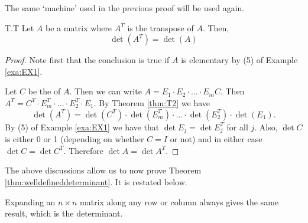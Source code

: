 The same `machine' used in the previous proof will be used again. 

\begin{theorem}{}{T.T} 
Let $A$ be a matrix where $A^T$ is the transpose of $A$. Then,
\begin{equation*}
\det\left(A^T\right) = \det \left( A \right)
\end{equation*}
\end{theorem} 

\begin{proof} 
Note first that the conclusion is true if $A$ is elementary by (5) of Example \ref{exa:EX1}. 

Let $C$ be the {\rref} of $A$. Then we can write 
$A= E_1\cdot E_2\cdot \dots\cdot E_m C$. 
Then $A^T=C^T\cdot E_m^T\cdot \dots \cdot E_2^T\cdot E_1$. 
By Theorem \ref{thm:T2} we have 
\[
\det (A^T)=\det (C^T)\cdot \det (E_m^T)\cdot \dots \cdot \det (E_2^T)\cdot \det(E_1).
\] 
By (5) of Example \ref{exa:EX1} we have that $\det E_j=\det E_j^T$ for all $j$. 
Also, $\det C$ is either 0 or 1 (depending on whether $C=I$ or not) and in either 
case $\det C=\det C^T$. Therefore $\det A=\det A^T$. 
\end{proof} 

The above discussions allow us to now prove Theorem \ref{thm:welldefineddeterminant}. It is restated below. 
 
\begin{theorem}{}{}
Expanding an $n\times n$ matrix along any row or column always gives the same result, which is the determinant. 
\end{theorem} 

